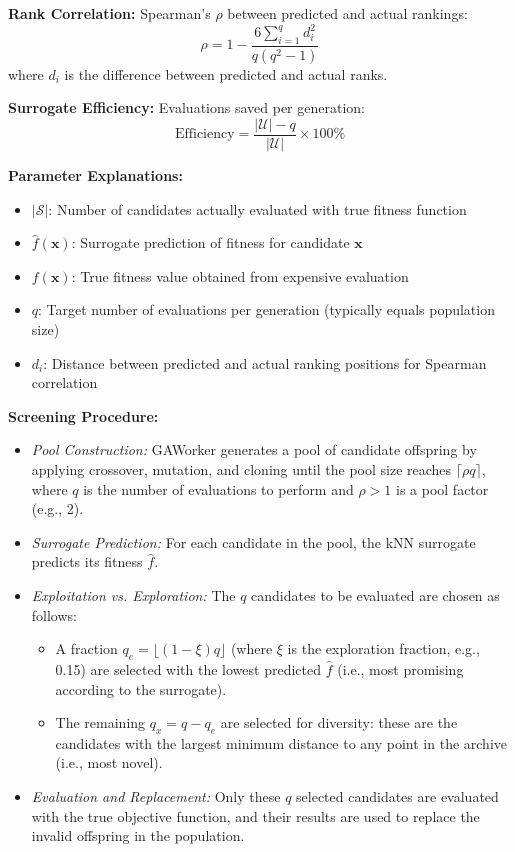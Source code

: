 \documentclass[12pt,a4paper]{article}
\begin{document}
\textbf{Rank Correlation:}
Spearman's $\rho$ between predicted and actual rankings:
\begin{equation}
\rho = 1 - \frac{6 \sum_{i=1}^q d_i^2}{q(q^2 - 1)} \label{eq:surrogate_rank_correlation}
\end{equation}
where $d_i$ is the difference between predicted and actual ranks.

\textbf{Surrogate Efficiency:}
Evaluations saved per generation:
\begin{equation}
\text{Efficiency} = \frac{|\mathcal{U}| - q}{|\mathcal{U}|} \times 100\% \label{eq:surrogate_efficiency}
\end{equation}

\textbf{Parameter Explanations:}
\begin{itemize}
\item $|\mathcal{S}|$: Number of candidates actually evaluated with true fitness function
\item $\hat{f}(\bm{x})$: Surrogate prediction of fitness for candidate $\bm{x}$
\item $f(\bm{x})$: True fitness value obtained from expensive evaluation
\item $q$: Target number of evaluations per generation (typically equals population size)
\item $d_i$: Distance between predicted and actual ranking positions for Spearman correlation
\end{itemize}

\textbf{Screening Procedure:}
\begin{itemize}
    \item \emph{Pool Construction:} GAWorker generates a pool of candidate offspring by applying crossover, mutation, and cloning until the pool size reaches $\lceil \rho q \rceil$, where $q$ is the number of evaluations to perform and $\rho > 1$ is a pool factor (e.g., 2).
    \item \emph{Surrogate Prediction:} For each candidate in the pool, the kNN surrogate predicts its fitness $\hat{f}$.
    \item \emph{Exploitation vs. Exploration:} The $q$ candidates to be evaluated are chosen as follows:
    \begin{itemize}
        \item A fraction $q_e = \lfloor (1-\xi)q \rfloor$ (where $\xi$ is the exploration fraction, e.g., 0.15) are selected with the lowest predicted $\hat{f}$ (i.e., most promising according to the surrogate).
        \item The remaining $q_x = q - q_e$ are selected for diversity: these are the candidates with the largest minimum distance to any point in the archive (i.e., most novel).
    \end{itemize}
    \item \emph{Evaluation and Replacement:} Only these $q$ selected candidates are evaluated with the true objective function, and their results are used to replace the invalid offspring in the population.
\end{itemize}
\end{document}
